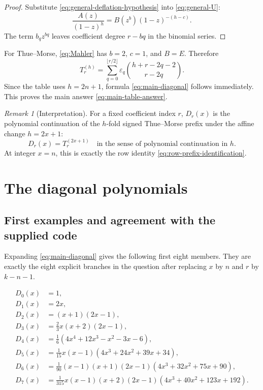 \documentclass[11pt,oneside]{article}
\numberwithin{equation}{section}
\theoremstyle{definition}
\theoremstyle{remark}
\newtheorem{remark}[theorem]{Remark}
\newcommand{\eps}{\varepsilon}
\newcommand{\Diag}{D}
\newcommand{\Prefix}{T}
\begin{document}
\begin{proof}
Substitute \eqref{eq:general-deflation-hypothesis} into
\eqref{eq:general-U}:
\[
 \frac{A(z)}{(1-z)^h}=B(z^b)(1-z)^{-(h-c)}.
\]
The term \(b_qz^{bq}\) leaves coefficient degree \(r-bq\) in the binomial
series.
\end{proof}

For Thue--Morse, \eqref{eq:Mahler} has \(b=2\), \(c=1\), and \(B=E\).
Therefore
\begin{equation}
 \Prefix_r^{(h)}
 =\sum_{q=0}^{\lfloor r/2\rfloor}
 \eps_q\binom{h+r-2q-2}{r-2q}.
 \label{eq:prefix-order-polynomial}
\end{equation}
Since the table uses \(h=2n+1\), formula \eqref{eq:main-diagonal} follows
immediately.  This proves the main answer \eqref{eq:main-table-answer}.

\begin{remark}[Interpretation]
For a fixed coefficient index \(r\), \(\Diag_r(x)\) is the polynomial
continuation of the \(h\)-fold signed Thue--Morse prefix under the affine
change \(h=2x+1\):
\begin{equation}
 \Diag_r(x)=\Prefix_r^{(2x+1)}
 \quad\text{in the sense of polynomial continuation in }h.
 \label{eq:polynomial-interpolation-interpretation}
\end{equation}
At integer \(x=n\), this is exactly the row identity
\eqref{eq:row-prefix-identification}.
\end{remark}

\section{The diagonal polynomials}

\subsection{First examples and agreement with the supplied code}

Expanding \eqref{eq:main-diagonal} gives the following first eight members.
They are exactly the eight explicit branches in the question after replacing
\(x\) by \(n\) and \(r\) by \(k-n-1\).

\begin{align}
 \Diag_0(x)&=1,\label{eq:D0}\\
 \Diag_1(x)&=2x,\label{eq:D1}\\
 \Diag_2(x)&=(x+1)(2x-1),\label{eq:D2}\\
 \Diag_3(x)&=\frac{2}{3}x(x+2)(2x-1),\label{eq:D3}\\
 \Diag_4(x)&=\frac{1}{6}
 (4x^4+12x^3-x^2-3x-6),\label{eq:D4}\\
 \Diag_5(x)&=\frac{1}{15}x(x-1)
 (4x^3+24x^2+39x+34),\label{eq:D5}\\
 \Diag_6(x)&=\frac{1}{90}(x-1)(x+1)(2x-1)
 (4x^3+32x^2+75x+90),\label{eq:D6}\\
 \Diag_7(x)&=\frac{1}{315}x(x-1)(x+2)(2x-1)
 (4x^3+40x^2+123x+192).\label{eq:D7}
\end{align}
\end{document}
